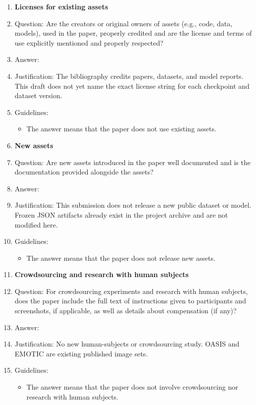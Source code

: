 \begin{enumerate}
\item {\bf Licenses for existing assets}
\item[] Question: Are the creators or original owners of assets (e.g., code, data, models), used in the paper, properly credited and are the license and terms of use explicitly mentioned and properly respected?
\item[] Answer: \answerNo{}
\item[] Justification: The bibliography credits papers, datasets, and model reports. This draft does not yet name the exact license string for each checkpoint and dataset version.
\item[] Guidelines:
\begin{itemize}
\item The answer \answerNA{} means that the paper does not use existing assets.
\end{itemize}

\item {\bf New assets}
\item[] Question: Are new assets introduced in the paper well documented and is the documentation provided alongside the assets?
\item[] Answer: \answerNA{}
\item[] Justification: This submission does not release a new public dataset or model. Frozen JSON artifacts already exist in the project archive and are not modified here.
\item[] Guidelines:
\begin{itemize}
\item The answer \answerNA{} means that the paper does not release new assets.
\end{itemize}

\item {\bf Crowdsourcing and research with human subjects}
\item[] Question: For crowdsourcing experiments and research with human subjects, does the paper include the full text of instructions given to participants and screenshots, if applicable, as well as details about compensation (if any)?
\item[] Answer: \answerNA{}
\item[] Justification: No new human-subjects or crowdsourcing study. OASIS and EMOTIC are existing published image sets.
\item[] Guidelines:
\begin{itemize}
\item The answer \answerNA{} means that the paper does not involve crowdsourcing nor research with human subjects.
\end{itemize}


\end{enumerate}
